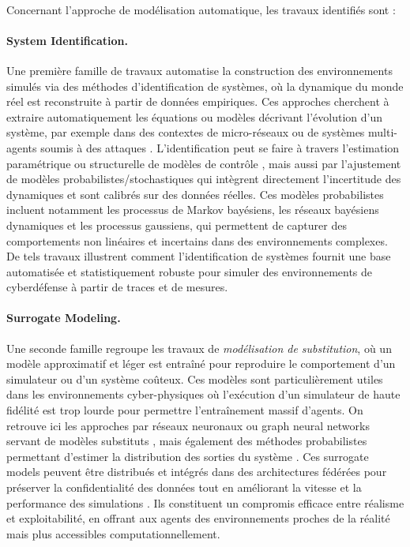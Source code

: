 \

Concernant l'approche de modélisation automatique, les travaux identifiés sont :

\paragraph{System Identification.}
Une première famille de travaux automatise la construction des environnements simulés via des méthodes d’identification de systèmes, où la dynamique du monde réel est reconstruite à partir de données empiriques. Ces approches cherchent à extraire automatiquement les équations ou modèles décrivant l’évolution d’un système, par exemple dans des contextes de micro-réseaux ou de systèmes multi-agents soumis à des attaques \cite{NtDvjag65BgJ, tBI-_piWs1cJ}. L’identification peut se faire à travers l’estimation paramétrique ou structurelle de modèles de contrôle \cite{g5PxHs45ZtYJ}, mais aussi par l’ajustement de modèles probabilistes/stochastiques qui intègrent directement l’incertitude des dynamiques et sont calibrés sur des données réelles. Ces modèles probabilistes incluent notamment les processus de Markov bayésiens, les réseaux bayésiens dynamiques et les processus gaussiens, qui permettent de capturer des comportements non linéaires et incertains dans des environnements complexes. De tels travaux illustrent comment l’identification de systèmes fournit une base automatisée et statistiquement robuste pour simuler des environnements de cyberdéfense à partir de traces et de mesures.

\paragraph{Surrogate Modeling.}
Une seconde famille regroupe les travaux de \textit{modélisation de substitution}, où un modèle approximatif et léger est entraîné pour reproduire le comportement d’un simulateur ou d’un système coûteux. Ces modèles sont particulièrement utiles dans les environnements cyber-physiques où l’exécution d’un simulateur de haute fidélité est trop lourde pour permettre l’entraînement massif d’agents. On retrouve ici les approches par réseaux neuronaux ou graph neural networks servant de modèles substituts \cite{g4qXIBHVJwUJ, Cr1JpifjcFwJ}, mais également des méthodes probabilistes permettant d’estimer la distribution des sorties du système \cite{hPBZHSLGStkJ}. Ces surrogate models peuvent être distribués et intégrés dans des architectures fédérées pour préserver la confidentialité des données tout en améliorant la vitesse et la performance des simulations \cite{g4qXIBHVJwUJ}. Ils constituent un compromis efficace entre réalisme et exploitabilité, en offrant aux agents des environnements proches de la réalité mais plus accessibles computationnellement.

